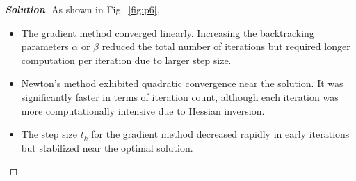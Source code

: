 \documentclass[11pt]{article}
\newenvironment{solution}
  {\renewcommand\qedsymbol{$\square$}\begin{proof}[\textbf{Solution}]}
  {\end{proof}}
\begin{document}
\begin{solution}
As shown in Fig.~\ref{fig:p6},
\begin{itemize}
    \item The gradient method converged linearly. Increasing the backtracking parameters $\alpha$ or $\beta$ reduced the total number of iterations but required longer computation per iteration due to larger step size.
    \item Newton's method exhibited quadratic convergence near the solution. It was significantly faster in terms of iteration count, although each iteration was more computationally intensive due to Hessian inversion.
    \item The step size $t_k$ for the gradient method decreased rapidly in early iterations but stabilized near the optimal solution.
\end{itemize}


\end{solution}
\end{document}
